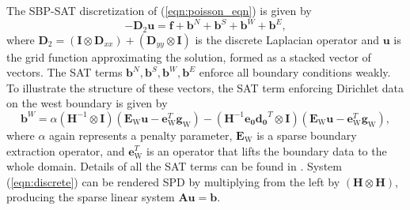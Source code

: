  
The SBP-SAT discretization of (\autoref{eqn:poisson_eqn}) is given by
\begin{equation}\label{eqn:discrete}
-\boldsymbol{D}_2\boldsymbol{u} = \boldsymbol{f} + \boldsymbol{b}^{N} + \boldsymbol{b}^{S} + \boldsymbol{b}^{W} + \boldsymbol{b}^{E},
\end{equation}
%
where $\boldsymbol{D}_2 = \left(\boldsymbol{I} \otimes \boldsymbol{D}_{xx}\right) +  \left(\boldsymbol{D}_{yy}  \otimes \boldsymbol{I}\right)$ is the discrete Laplacian operator and $\boldsymbol{u}$ is the grid function approximating the solution, formed as a stacked vector of vectors. The SAT terms $\boldsymbol{b}^{N}, \boldsymbol{b}^{S}, \boldsymbol{b}^{W}, \boldsymbol{b}^{E}$ enforce all boundary conditions weakly. To illustrate the structure of these vectors, the SAT term enforcing Dirichlet data on the west boundary is given by 
\begin{equation}
\boldsymbol{b}^{W} = \alpha \left(\boldsymbol{H}^{-1} \otimes \boldsymbol{I}\right) (\boldsymbol{E}_\text{W}\boldsymbol{u} - \boldsymbol{e}^T_\text{W}\boldsymbol{g}_\text{W}) 
- \left(\boldsymbol{H}^{-1}\boldsymbol{e_0}\boldsymbol{d_0}^T \otimes \boldsymbol{I}\right) (\boldsymbol{E}_\text{W}\boldsymbol{u} - \boldsymbol{e}^T_\text{W}\boldsymbol{g}_\text{W}),
\end{equation}
where $\alpha$ again represents a penalty parameter, $\boldsymbol{E}_\text{W}$ is a sparse boundary extraction operator, and $\boldsymbol{e}^T_\text{W}$ is an operator that lifts the boundary data to the whole domain. Details of all the SAT terms can be found in \citep{Erickson2014}.
System (\autoref{eqn:discrete}) can be rendered SPD by multiplying from the left by $\left(\boldsymbol{H} \otimes \boldsymbol{H}\right)$,  producing the sparse linear system $\boldsymbol{Au} = \boldsymbol{b}$.